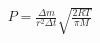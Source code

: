 \begin{eqnarray*}
P =
\frac{
\Delta m
}{
r^2
\Delta t
}
\sqrt{
\frac{
2RT
}{
\pi
M
}
}
\label{}
\end{eqnarray*}
